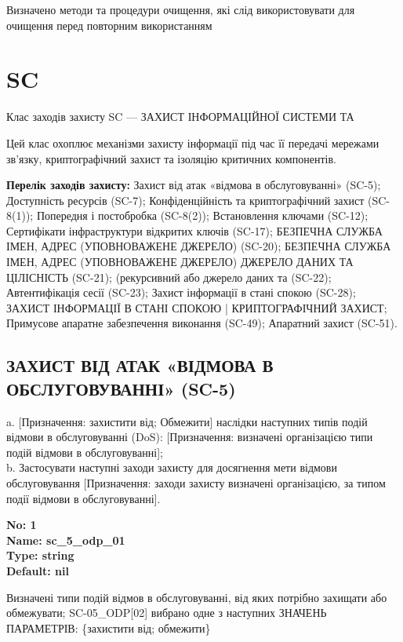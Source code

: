 \documentclass{article}
\begin{document}
{\footnotesize Визначено методи та процедури очищення, які слід використовувати для очищення перед повторним використанням}




\section{SC}
Клас заходів захисту SC --- ЗАХИСТ ІНФОРМАЦІЙНОЇ СИСТЕМИ ТА

Цей клас охоплює механізми захисту інформації під час її передачі мережами зв'язку, криптографічний захист та ізоляцію критичних компонентів.

\textbf{Перелік заходів захисту:} Захист від атак «відмова в обслуговуванні» (SC-5); Доступність ресурсів (SC-7); Конфіденційність та криптографічний захист (SC-8(1)); Попередня і постобробка (SC-8(2)); Встановлення ключами (SC-12); Сертифікати інфраструктури відкритих ключів (SC-17); БЕЗПЕЧНА СЛУЖБА ІМЕН, АДРЕС (УПОВНОВАЖЕНЕ ДЖЕРЕЛО) (SC-20); БЕЗПЕЧНА СЛУЖБА ІМЕН, АДРЕС (УПОВНОВАЖЕНЕ ДЖЕРЕЛО) ДЖЕРЕЛО ДАНИХ ТА ЦІЛІСНІСТЬ (SC-21); (рекурсивний або джерело даних та (SC-22); Автентифікація сесії (SC-23); Захист інформації в стані спокою (SC-28); ЗАХИСТ ІНФОРМАЦІЇ В СТАНІ СПОКОЮ | КРИПТОГРАФІЧНИЙ ЗАХИСТ; Примусове апаратне забезпечення виконання (SC-49); Апаратний захист (SC-51).

\subsection{ЗАХИСТ ВІД АТАК «ВІДМОВА В ОБСЛУГОВУВАННІ» (SC-5)}
a. [Призначення: захистити від; Обмежити] наслідки наступних типів подій відмови в обслуговуванні (DoS): [Призначення: визначені організацією типи подій відмови в обслуговуванні];\\ 
b. Застосувати наступні заходи захисту для досягнення мети відмови обслуговування [Призначення: заходи захисту визначені організацією, за типом події відмови в обслуговуванні].

\vspace{10pt}
{\footnotesize\bfseries
No: 1\\
Name: sc\_\allowbreak{}5\_\allowbreak{}odp\_\allowbreak{}01\\
Type: string\\
Default: nil
}

{\footnotesize Визначені типи подій відмов в обслуговуванні, від яких потрібно захищати або обмежувати; SC-05\_\allowbreak{}ODP[02] вибрано одне з наступних ЗНАЧЕНЬ ПАРАМЕТРІВ: \{захистити від; обмежити\}}
\end{document}
